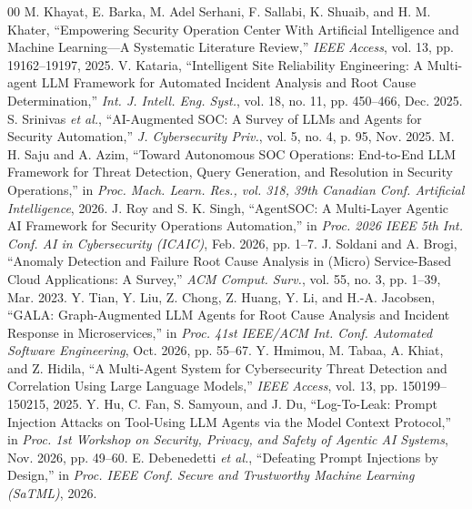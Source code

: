 \documentclass[conference]{IEEEtran}
\begin{document}
\begin{thebibliography}{00}
 M. Khayat, E. Barka, M. Adel Serhani, F. Sallabi, K. Shuaib, and H. M. Khater, ``Empowering Security Operation Center With Artificial Intelligence and Machine Learning---A Systematic Literature Review,'' \textit{IEEE Access}, vol. 13, pp. 19162--19197, 2025.
 V. Kataria, ``Intelligent Site Reliability Engineering: A Multi-agent LLM Framework for Automated Incident Analysis and Root Cause Determination,'' \textit{Int. J. Intell. Eng. Syst.}, vol. 18, no. 11, pp. 450--466, Dec. 2025.
 S. Srinivas \textit{et al.}, ``AI-Augmented SOC: A Survey of LLMs and Agents for Security Automation,'' \textit{J. Cybersecurity Priv.}, vol. 5, no. 4, p. 95, Nov. 2025.
 M. H. Saju and A. Azim, ``Toward Autonomous SOC Operations: End-to-End LLM Framework for Threat Detection, Query Generation, and Resolution in Security Operations,'' in \textit{Proc. Mach. Learn. Res., vol. 318, 39th Canadian Conf. Artificial Intelligence}, 2026.
 J. Roy and S. K. Singh, ``AgentSOC: A Multi-Layer Agentic AI Framework for Security Operations Automation,'' in \textit{Proc. 2026 IEEE 5th Int. Conf. AI in Cybersecurity (ICAIC)}, Feb. 2026, pp. 1--7.
 J. Soldani and A. Brogi, ``Anomaly Detection and Failure Root Cause Analysis in (Micro) Service-Based Cloud Applications: A Survey,'' \textit{ACM Comput. Surv.}, vol. 55, no. 3, pp. 1--39, Mar. 2023.
 Y. Tian, Y. Liu, Z. Chong, Z. Huang, Y. Li, and H.-A. Jacobsen, ``GALA: Graph-Augmented LLM Agents for Root Cause Analysis and Incident Response in Microservices,'' in \textit{Proc. 41st IEEE/ACM Int. Conf. Automated Software Engineering}, Oct. 2026, pp. 55--67.
 Y. Hmimou, M. Tabaa, A. Khiat, and Z. Hidila, ``A Multi-Agent System for Cybersecurity Threat Detection and Correlation Using Large Language Models,'' \textit{IEEE Access}, vol. 13, pp. 150199--150215, 2025.
 Y. Hu, C. Fan, S. Samyoun, and J. Du, ``Log-To-Leak: Prompt Injection Attacks on Tool-Using LLM Agents via the Model Context Protocol,'' in \textit{Proc. 1st Workshop on Security, Privacy, and Safety of Agentic AI Systems}, Nov. 2026, pp. 49--60.
 E. Debenedetti \textit{et al.}, ``Defeating Prompt Injections by Design,'' in \textit{Proc. IEEE Conf. Secure and Trustworthy Machine Learning (SaTML)}, 2026.
\end{thebibliography}
\end{document}
